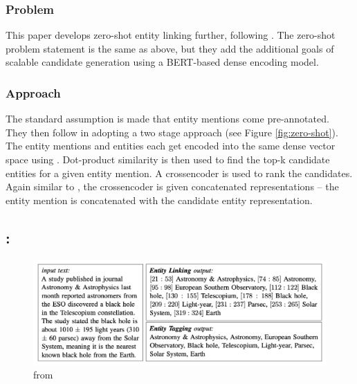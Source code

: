 \documentclass{article}
\begin{document}
\subsubsection{Problem}

This paper develops zero-shot entity linking further, following \cite{logeswaran_zero-shot_2019}.  The zero-shot problem statement is the same as above, but they add the additional goals of scalable candidate generation using a BERT-based dense encoding model.

\subsubsection{Approach}

The standard assumption is made that entity mentions come pre-annotated. They then follow \cite{logeswaran_zero-shot_2019} in adopting a two stage approach (see Figure \ref{fig:zero-shot}). The entity mentions and entities each get encoded into the same dense vector space using . Dot-product similarity is then used to find the top-k candidate entities for a given entity mention. A crossencoder is used to rank the candidates. Again similar to \cite{logeswaran_zero-shot_2019}, the crossencoder is given concatenated representations -- the entity mention is concatenated with the candidate entity representation.

\subsection{\cite{du_entity_2022}: }

\begin{figure}
\centering
\includegraphics[scale=0.5]{entity-tagging-fig-1}
\caption{from \cite{du_entity_2022}}
\label{fig:entity-tagging}
\end{figure}
\end{document}
